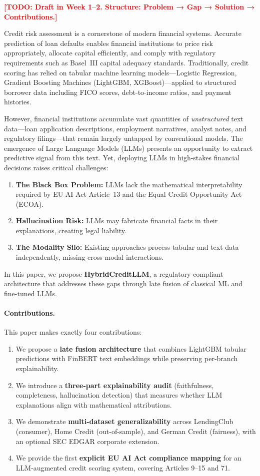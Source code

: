 \documentclass[preprint,12pt]{elsarticle}
\newcommand{\TODO}[1]{\textcolor{red}{\textbf{[TODO: #1]}}}
\begin{document}
\TODO{Draft in Week 1--2. Structure: Problem → Gap → Solution → Contributions.}

Credit risk assessment is a cornerstone of modern financial systems. Accurate prediction of loan defaults enables financial institutions to price risk appropriately, allocate capital efficiently, and comply with regulatory requirements such as Basel~III capital adequacy standards. Traditionally, credit scoring has relied on tabular machine learning models---Logistic Regression, Gradient Boosting Machines (LightGBM, XGBoost)---applied to structured borrower data including FICO scores, debt-to-income ratios, and payment histories.

However, financial institutions accumulate vast quantities of \emph{unstructured} text data---loan application descriptions, employment narratives, analyst notes, and regulatory filings---that remain largely untapped by conventional models. The emergence of Large Language Models (LLMs) presents an opportunity to extract predictive signal from this text. Yet, deploying LLMs in high-stakes financial decisions raises critical challenges:

\begin{enumerate}
    \item \textbf{The Black Box Problem:} LLMs lack the mathematical interpretability required by EU AI Act Article~13 and the Equal Credit Opportunity Act (ECOA).
    \item \textbf{Hallucination Risk:} LLMs may fabricate financial facts in their explanations, creating legal liability.
    \item \textbf{The Modality Silo:} Existing approaches process tabular and text data independently, missing cross-modal interactions.
\end{enumerate}

In this paper, we propose \textbf{HybridCreditLLM}, a regulatory-compliant architecture that addresses these gaps through late fusion of classical ML and fine-tuned LLMs.

\paragraph{Contributions.} This paper makes exactly four contributions:
\begin{enumerate}
    \item We propose a \textbf{late fusion architecture} that combines LightGBM tabular predictions with FinBERT text embeddings while preserving per-branch explainability.
    \item We introduce a \textbf{three-part explainability audit} (faithfulness, completeness, hallucination detection) that measures whether LLM explanations align with mathematical attributions.
    \item We demonstrate \textbf{multi-dataset generalizability} across LendingClub (consumer), Home Credit (out-of-sample), and German Credit (fairness), with an optional SEC EDGAR corporate extension.
    \item We provide the first \textbf{explicit EU AI Act compliance mapping} for an LLM-augmented credit scoring system, covering Articles 9--15 and 71.
\end{enumerate}
\end{document}
